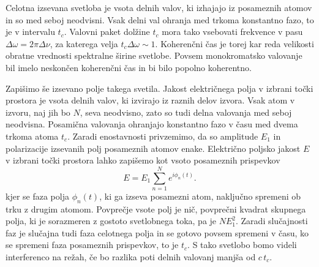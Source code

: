 Celotna izsevana svetloba je vsota delnih valov, ki izhajajo iz posameznih
atomov in so med seboj neodvisni. Vsak delni val ohranja med trkoma
konstantno fazo, to je v intervalu $t_{c}$. Valovni paket dolžine 
$t_{c}$ mora tako vsebovati frekvence v pasu $\Delta\omega = 2 \pi \Delta \nu$,
za katerega velja $t_{c}\Delta\omega\sim1$. Koherenčni čas je torej
kar reda velikosti obratne vrednosti spektralne širine svetlobe. Povsem
monokromatsko valovanje bil imelo neskončen koherenčni čas in bi bilo
popolno koherentno.

Zapišimo še izsevano polje takega svetila. 
Jakost električnega polja v izbrani točki prostora je vsota delnih
valov, ki izvirajo iz raznih delov izvora. Vsak atom v izvoru, naj
jih bo $N$, seva neodvisno, zato so tudi delna valovanja med seboj
neodvisna. Posamična valovanja ohranjajo konstantno fazo v času med
dvema trkoma atoma $t_{c}$. Zaradi enostavnosti privzemimo,
da so amplitude $E_{1}$ in polarizacije izsevanih polj posameznih atomov enake. 
Električno poljsko jakost $E$ v izbrani točki prostora lahko 
zapišemo kot vsoto posameznih prispevkov
\begin{equation}
E=E_{1}\sum_{n=1}^{N}e^{i\phi_{n}(t)}.
\label{eq:amplituda-random}
\end{equation}
kjer se faza polja $\phi_{n}(t)$, ki ga izseva posamezni atom, naključno
spremeni ob trku z drugim atomom. Povprečje vsote polj je nič, 
povprečni kvadrat skupnega polja, ki je sorazmeren
z gostoto svetlobnega toka, pa je $NE_{1}^{2}$. Zaradi slučajnosti faz je 
slučajna tudi faza celotnega polja in se gotovo povsem spremeni v času, ko se
spremeni faza posameznih prispevkov, to je $t_{c}$. S tako svetlobo bomo videli 
interferenco na režah, če bo razlika poti delnih valovanj manjša od $c\, t_{c}$.


